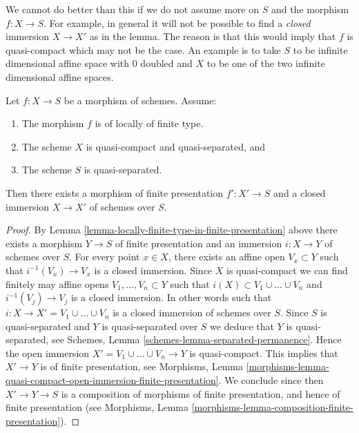 \begin{remark}
\label{remark-cannot-do-better}
We cannot do better than this if we do not assume
more on $S$ and the morphism $f : X \to S$.
For example, in general it will not be possible to
find a {\it closed} immersion $X \to X'$ as in the lemma.
The reason is that this would imply that $f$ is quasi-compact which
may not be the case. An example is to take $S$ to be infinite
dimensional affine space with $0$ doubled and $X$ to be one of
the two infinite dimensional affine spaces.
\end{remark}

\begin{lemma}
\label{lemma-finite-type-closed-in-finite-presentation}
Let $f : X \to S$ be a morphism of schemes.
Assume:
\begin{enumerate}
\item The morphism $f$ is of locally of finite type.
\item The scheme $X$ is quasi-compact and quasi-separated, and
\item The scheme $S$ is quasi-separated.
\end{enumerate}
Then there exists a morphism of finite presentation
$f' : X' \to S$ and a closed immersion $X \to X'$ of schemes over $S$.
\end{lemma}

\begin{proof}
By Lemma \ref{lemma-locally-finite-type-in-finite-presentation} above
there exists a morphism $Y \to S$ of finite presentation and an
immersion $i : X \to Y$ of schemes over $S$.
For every point $x \in X$, there exists an affine open
$V_x \subset Y$ such that $i^{-1}(V_x) \to V_x$ is a
closed immersion. Since $X$ is quasi-compact we can find
finitely may affine opens $V_1, \ldots, V_n \subset Y$
such that $i(X) \subset V_1 \cup \ldots \cup V_n$ and
$i^{-1}(V_j) \to V_j$ is a closed immersion. In other words
such that $i : X \to X' = V_1 \cup \ldots \cup V_n$ is a
closed immersion of schemes over $S$.
Since $S$ is quasi-separated and $Y$ is quasi-separated over $S$
we deduce that $Y$ is quasi-separated, see
Schemes, Lemma \ref{schemes-lemma-separated-permanence}.
Hence the open immersion $X' = V_1 \cup \ldots \cup V_n \to Y$
is quasi-compact. This implies that
$X' \to Y$ is of finite presentation, see
Morphisms,
Lemma \ref{morphisms-lemma-quasi-compact-open-immersion-finite-presentation}.
We conclude since then $X' \to Y \to S$ is a composition of morphisms
of finite presentation, and hence of finite presentation (see
Morphisms, Lemma \ref{morphisms-lemma-composition-finite-presentation}).
\end{proof}

